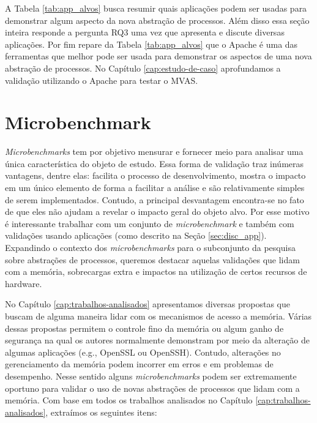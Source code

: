 A Tabela \ref{tab:app_alvos} busca resumir quais aplicações podem ser usadas
para demonstrar algum aspecto da nova abstração de processos. Além disso essa
seção inteira responde a pergunta RQ3 uma vez que apresenta e discute diversas
aplicações. Por fim repare da Tabela \ref{tab:app_alvos} que o Apache é uma das
ferramentas que melhor pode ser usada para demonstrar os aspectos de uma nova
abstração de processos. No Capítulo \ref{cap:estudo-de-caso} aprofundamos a
validação utilizando o Apache para testar o MVAS. 



\section{Microbenchmark}
\label{sec:micro}

\textit{Microbenchmarks} tem por objetivo mensurar e fornecer meio para
analisar uma única característica do objeto de estudo. Essa forma de validação
traz inúmeras vantagens, dentre elas: facilita o processo de desenvolvimento,
mostra o impacto em um único elemento de forma a facilitar a análise e são
relativamente simples de serem implementados. Contudo, a principal desvantagem
encontra-se no fato de que eles não ajudam a revelar o impacto geral do objeto
alvo. Por esse motivo é interessante trabalhar com um conjunto de
\textit{microbenchmark} e também com validações usando aplicações (como
descrito na Seção \ref{sec:disc_app}). Expandindo o contexto dos
\textit{microbenchmarks} para o subconjunto da pesquisa sobre abstrações de
processos, queremos destacar aquelas validações que lidam com a memória,
sobrecargas extra e impactos na utilização de certos recursos de hardware.

No Capítulo \ref{cap:trabalhos-analisados} apresentamos diversas propostas que
buscam de alguma maneira lidar com os mecanismos de acesso a memória. Várias
dessas propostas permitem o controle fino da memória ou algum ganho de
segurança na qual os autores normalmente demonstram por meio da alteração de
algumas aplicações (e.g., OpenSSL ou OpenSSH). Contudo, alterações no
gerenciamento da memória podem incorrer em erros e em problemas de desempenho.
Nesse sentido alguns \textit{microbenchmarks} podem ser extremamente oportuno
para validar o uso de novas abstrações de processos que lidam com a memória.
Com base em todos os trabalhos analisados no Capítulo
\ref{cap:trabalhos-analisados}, extraímos os seguintes itens:

